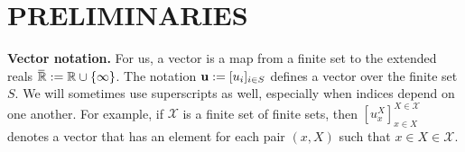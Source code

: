 \documentclass[twoside]{article}
\begin{document}
\section{PRELIMINARIES}

\textbf{Vector notation.}
For us, a vector is a map from a finite set to the extended reals
    $\mskip1mu\overline{\mskip-1mu\mathbb R\!}\, := \mathbb R \cup \{\infty\}$. 
The notation $\mathbf{u} := [u_i]_{i \in S}$ defines a vector over the
finite set $S$.
We will sometimes use superscripts as well, especially when indices
depend on one another. For example, if $\mathcal X$ is a finite set of
finite sets, then 
$[u^X_x]^{X \in \mathcal X}_{x \in X}$ denotes a vector that has an element
for each pair $(x,X)$ such that $x \in X \in \mathcal X$.
\end{document}
